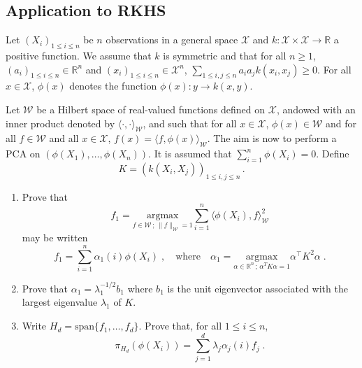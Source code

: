 \documentclass[a4paper,10pt,fleqn]{article}
\newcommand{\eqsp}{\,}
\newcommand{\rset}{\ensuremath{\mathbb{R}}}
\newcommand{\W}{\ensuremath{\mathcal{W}}}
\newcommand{\X}{\ensuremath{\mathcal{X}}}
\newcommand{\1}{\ensuremath{\mathbbm{1}}}
\newcommand{\bfK}{K}
\begin{document}
\subsection*{Application to RKHS}
Let $(X_i)_{1\le i \le n}$ be $n$ observations in a general space $\X$ and $k: \X\times \X \to \rset$ a positive function. We assume that $k$ is symmetric and that for all $n\geqslant 1$, $(a_i)_{1\leqslant i \leqslant n}\in\rset^n$ and $(x_i)_{1\leqslant i \leqslant n}\in\X^n$, $\sum_{1\leqslant i,j \leqslant n}a_ia_j k(x_i,x_j)\geqslant 0$.  For all $x\in\X$, $\phi(x)$ denotes the function $\phi(x): y\to k(x,y)$.

Let $\W$ be a Hilbert space of real-valued functions defined on $\X$, andowed with an inner product denoted by $\langle \cdot,\cdot \rangle_{\W}$, and such that for all $x\in\X$, $\phi(x)\in\W$ and for all $f\in \W$ and all $x\in\X$, $f(x) = \langle f,\phi(x) \rangle_{\W}$. The aim is now to perform a PCA on $(\phi(X_1),\ldots,\phi(X_n))$. It is assumed that $\sum_{i=1}^n \phi(X_i) = 0$. Define
$$
\bfK = \left(k(X_i,X_j)\right)_{1\leqslant i,j \leqslant n}\eqsp.
$$
\begin{enumerate}
\item Prove that
$$
f_1 =  \underset{f\in \W\,;\,\|f\|_\W=1}{\mathrm{argmax}} \sum_{i=1}^n\langle \phi(X_i),f\rangle_\W^2
$$
may be written
$$
f_1 = \sum_{i=1}^n \alpha_1(i) \phi(X_i)\;,\quad\mbox{where}\quad \alpha_1 =  \underset{\alpha\in \rset^n\,;\, \alpha^T \bfK\alpha=1}{\mathrm{argmax}}\alpha^\top\bfK^2\alpha\;.
$$
\item Prove that $\alpha_1 = \lambda_1^{-1/2}b_1$ where $b_1$ is the unit eigenvector associated with the largest eigenvalue $\lambda_1$ of $\bfK$.
\item Write $H_d = \mathrm{span}\{f_1,\ldots,f_d\}$. Prove that, for all $1\leqslant i\leqslant n$,
$$
\pi_{H_d}(\phi(X_i)) = \sum_{j=1}^d \lambda_{j}\alpha_j(i)f_j\;.
$$
\end{enumerate}
\end{document}
